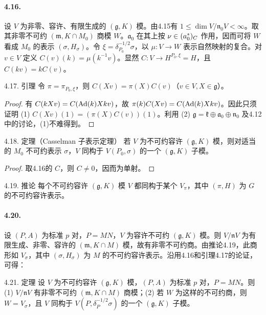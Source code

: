 \paragraph*{4.16.} 设 $V$ 为非零、容许、有限生成的 $(\mathfrak g,K)$ 模。由4.15有 $1\le\dim V/\mathfrak n_0V<\infty$。取其非零不可约 $(\mathfrak m,K\cap M_0)$ 商模 $W$。$\mathfrak a_0$ 在其上按 $\nu\in(a_0^*)_{C}$ 作用，因而可将 $W$ 看成 $M_0$ 的表示 $(\sigma,H_\sigma)$。令 $\xi=\delta_{P_0}^{-1/2}\sigma$，以 $\mu:V\to W$ 表示自然映射的复合。对 $v\in V$ 定义 $C(v)(k)=\mu(k^{-1}v)$。显然 $C:V\to H^{P_0,\xi}=H$，且 $C(kv)=kC(v)$。
\begin{originaltheorem}{4.17. 引理}
令 $\pi=\pi_{P_0,\xi}$，则 $C(Xv)=\pi(X)C(v)$（$v\in V,X\in\mathfrak g$）。
\end{originaltheorem}
\begin{proof}
有 $C(kXv)=C(\operatorname{Ad}(k)Xkv)$，故 $\pi(k)C(Xv)=C(\operatorname{Ad}(k)Xkv)$。因此只须证明 (1) $C(Xv)(1)=(\pi(X)C(v))(1)$。利用 (2) $\mathfrak g=\mathfrak k\oplus\mathfrak a_0\oplus\mathfrak n_0$ 及4.12中的讨论，(1)不难得到。
\end{proof}
\begin{originaltheorem}{4.18. 定理（Casselman 子表示定理）}
若 $V$ 为不可约容许 $(\mathfrak g,K)$ 模，则对适当的 $M_0$ 不可约表示 $\sigma$，$V$ 同构于 $V(P_0,\sigma)$ 的一个 $(\mathfrak g,K)$ 子模。
\end{originaltheorem}
\begin{proof}
取4.16的 $C$，则 $C\ne0$，因而为单射。
\end{proof}
\begin{originaltheorem}{4.19. 推论}
每个不可约容许 $(\mathfrak g,K)$ 模 $V$ 都同构于某个 $V_\pi$，其中 $(\pi,H)$ 为 $G$ 的不可约容许表示。
\end{originaltheorem}
\paragraph*{4.20.} 设 $(P,A)$ 为标准 $p$ 对，$P=MN$，$V$ 为容许不可约 $(\mathfrak g,K)$ 模。则 $V/\mathfrak nV$ 为有限生成、非零、容许的 $(\mathfrak m,K\cap M)$ 模，故有非零不可约商。由推论4.19，此商形如 $V_\sigma$，其中 $(\sigma,H_\sigma)$ 为 $M$ 的不可约容许表示。沿用4.16和引理4.17的论证，可得：
\begin{originaltheorem}{4.21. 定理}
设 $V$ 为不可约容许 $(\mathfrak g,K)$ 模，$(P,A)$ 为标准 $p$ 对，$P=MN$。则 (1) $V/\mathfrak nV$ 有非零不可约 $(\mathfrak m,K\cap M)$ 商模；(2) 若 $W$ 为这样的不可约商，则 $W=V_\sigma$，且 $V$ 同构于 $V(P,\delta_P^{-1/2}\sigma)$ 的一个 $(\mathfrak g,K)$ 子模。
\end{originaltheorem}

